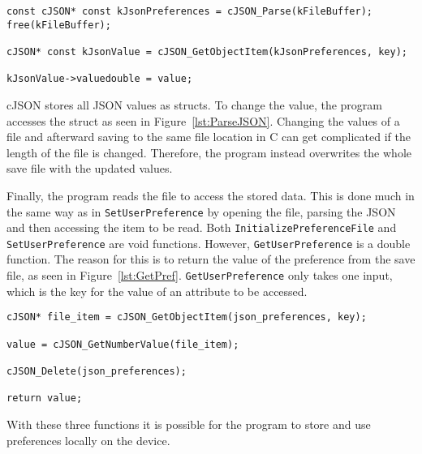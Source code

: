 \begin{lstlisting}[label={lst:ParseJSON}, caption={Parsing JSON.}, captionpos=b]
const cJSON* const kJsonPreferences = cJSON_Parse(kFileBuffer);
free(kFileBuffer);

cJSON* const kJsonValue = cJSON_GetObjectItem(kJsonPreferences, key);

kJsonValue->valuedouble = value;
\end{lstlisting}

cJSON stores all JSON values as structs.
To change the value, the program accesses the struct as seen in Figure~\ref{lst:ParseJSON}.
Changing the values of a file and afterward saving to the same file location in C can get complicated if the length of
the file is changed.
Therefore, the program instead overwrites the whole save file with the updated values.

Finally, the program reads the file to access the stored data.
This is done much in the same way as in \texttt{SetUserPreference} by opening the file, parsing the JSON and then
accessing the item to be read.
Both \texttt{InitializePreferenceFile} and \texttt{SetUserPreference} are void functions.
However, \texttt{GetUserPreference} is a double function.
The reason for this is to return the value of the preference from the save file, as seen in Figure~\ref{lst:GetPref}.
\texttt{GetUserPreference} only takes one input, which is the key for the value of an attribute to be accessed.

\begin{lstlisting}[label={lst:GetPref}, caption={Reading attribute value from preference file.}, captionpos=b]
cJSON* file_item = cJSON_GetObjectItem(json_preferences, key);

value = cJSON_GetNumberValue(file_item);

cJSON_Delete(json_preferences);

return value;
\end{lstlisting}

With these three functions it is possible for the program to store and use preferences locally on the device.
